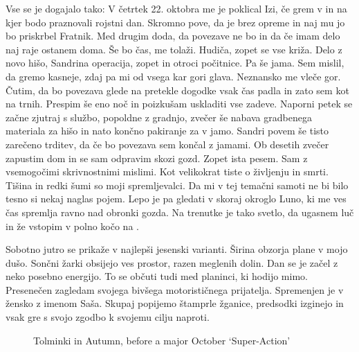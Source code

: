   Vse se je dogajalo tako: V četrtek 22. oktobra me je poklical Izi, če grem v  in na  kjer bodo praznovali rojstni dan. Skromno pove, da je brez opreme in naj mu jo bo priskrbel Fratnik. Med drugim doda, da povezave ne bo in da če imam delo naj raje ostanem doma. Še bo čas, me tolaži. Hudiča, zopet se vse križa. Delo z novo hišo, Sandrina operacija, zopet in otroci počitnice. Pa še jama. Sem mislil, da gremo kasneje, zdaj pa mi od vsega kar gori glava. Neznansko me vleče gor. Čutim, da bo povezava glede na pretekle dogodke vsak čas padla in zato sem kot na trnih. Prespim še eno noč in poizkušam uskladiti vse zadeve. Naporni petek se začne zjutraj s službo, popoldne z gradnjo, zvečer še nabava gradbenega materiala za hišo in nato končno pakiranje za v jamo. Sandri povem še tisto zarečeno trditev, da če bo povezava sem končal z jamami.  Ob desetih zvečer zapustim dom in se sam odpravim skozi gozd. Zopet ista pesem. Sam z vsemogočimi skrivnostnimi mislimi. Kot velikokrat tiste o življenju in smrti. Tišina in redki šumi so moji spremljevalci. Da mi v tej temačni samoti ne bi bilo tesno si nekaj naglas pojem. Lepo je pa gledati v skoraj okroglo Luno, ki me ves čas spremlja ravno nad obronki gozda. Na trenutke je tako svetlo, da ugasnem luč in že vstopim v polno kočo na . 

  Sobotno jutro se prikaže v najlepši jesenski varianti. Širina obzorja plane v mojo dušo. Sončni žarki obsijejo ves prostor, razen meglenih dolin. Dan se je začel z neko posebno energijo. To se občuti tudi med planinci, ki hodijo mimo. Presenečen zagledam svojega bivšega motorističnega prijatelja. Spremenjen je v žensko z imenom Saša. Skupaj popijemo štamprle žganice, predsodki izginejo in vsak gre s svojo zgodbo k svojemu cilju naproti. 
  
\begin{figure}[t!]
\checkoddpage \ifoddpage \forcerectofloat \else \forceversofloat \fi
\centering
{}
\caption{Tolminki \protect{} in Autumn, before a major October `Super-Action' }
\label{migovec in autumn}
\end{figure}

